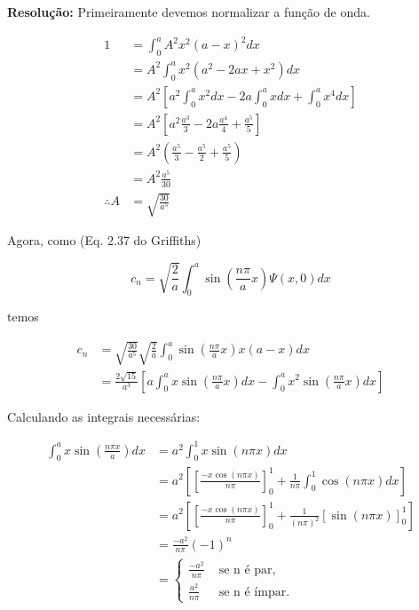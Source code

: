\documentclass[a4paper, 12pt, notitlepage]{article}
\begin{document}
\begin{enumerate}
\textbf{Resolução: }
  Primeiramente devemos normalizar a função de onda.

  \begin{align*}
    1 &= \int_0^a A^2 x^2 (a - x)^2 dx \\
    &= A^2 \int_0^a  x^2(a^2 - 2ax + x^2) dx \\
    &= A^2 \left[ a^2 \int_0^a x^2 dx - 2a \int_0^a x dx + \int_0^a x^4 dx \right] \\
    &= A^2 \left[ a^2 \frac{a^3}{3} - 2a \frac{a^4}{4} + \frac{a^5}{5} \right] \\
    &= A^2 \left(\frac{a^5}{3} - \frac{a^5}{2} + \frac{a^5}{5}\right) \\
    &= A^2 \frac{a^5}{30} \\
    \therefore A &= \sqrt{\frac{30}{a^5}}
  \end{align*}

  Agora, como (Eq. 2.37 do Griffiths)
  
  \begin{equation*}
  c_{n} = \sqrt{\frac{2}{a}} \int_0^a \sin\left(\frac{n\pi}{a} x\right) \Psi(x,0) dx
  \end{equation*}
  
  temos
  
  \begin{align*}
  c_n &= \sqrt{\frac{30}{a^5}} \sqrt{\frac{2}{a}} \int_0^a \sin\left(\frac{n\pi}{a} x \right) x(a-x) dx \\
  &= \frac{2\sqrt{15}}{a^3}\left[ a\int_0^a x\sin\left(\frac{n\pi}{a} x \right) dx - \int_0^a x^2 \sin\left(\frac{n\pi}{a} x \right)dx \right]
  \end{align*}
  
  Calculando as integrais necessárias:
  
  \begin{align*}
  \int_0^a x \sin\left(\frac{n\pi x}{a}\right) dx &= a^2 \int_0^1 x \sin (n\pi x) dx \\
  &= a^2\left[\left[\frac{-x\cos(n\pi x)}{n\pi}\right]_0^1 + \frac{1}{n\pi} \int_0^1 \cos(n\pi x) dx \right] \\
  &= a^2\left[\left[\frac{-x\cos(n\pi x)}{n\pi}\right]_0^1 + \frac{1}{(n\pi)^2} \left[\sin(n\pi x)\right]_0^1 \right] \\
  &= \frac{-a^2}{n\pi} (-1)^n \\
  &= 
    \begin{cases}
      \frac{-a^2}{n\pi}&\text{ se n é par,}\\
      \frac{a^2}{n\pi}&\text{ se n é ímpar.}
    \end{cases}
  \end{align*}
  

\end{enumerate}
\end{document}
